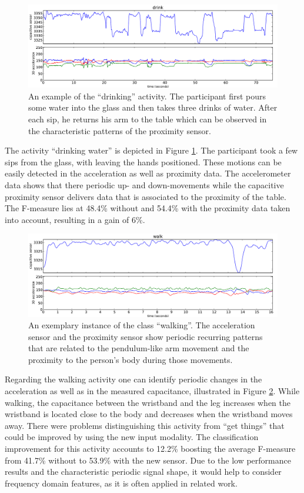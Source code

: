 \documentclass[runningheads,a4paper]{llncs}
\begin{document}
\begin{figure}[t]
	\centering
		\includegraphics[width=\textwidth]{../Auswertung/images/eugen_7.pdf}
	\caption{An example of the ``drinking'' activity. The participant first pours some water into the glass and then takes three drinks of water. After each sip, he returns his arm to the table which can be observed in the characteristic patterns of the proximity sensor.}
	\label{fig:drinking}
\end{figure}

The activity ``drinking water'' is depicted in Figure \ref{fig:drinking}. The participant took a few sips from the glass, with leaving the hands positioned. These motions can be easily detected in the acceleration as well as proximity data. The accelerometer data shows that there periodic up- and down-movements while the capacitive proximity sensor delivers data that is associated to the proximity of the table. The F-measure lies at 48.4\% without and 54.4\% with the proximity data taken into account, resulting in a gain of 6\%.

\begin{figure}[t]
	\centering
		\includegraphics[width=1.00\textwidth]{../Auswertung/images/marko_8.pdf}
	\caption{An exemplary instance of the class ``walking''. The acceleration sensor and the proximity sensor show periodic recurring patterns that are related to the pendulum-like arm movement and the proximity to the person's body during those movements.}
	\label{fig:walking}
\end{figure}

Regarding the walking activity one can identify periodic changes in the acceleration as well as in the measured capacitance, illustrated in Figure \ref{fig:walking}. While walking, the capacitance between the wristband and the leg increases when the wristband is located close to the body and decreases when the wristband moves away. There were problems distinguishing this activity from ``get things'' that could be improved by using the new input modality. The classification improvement for this activity accounts to 12.2\% boosting the average F-measure from 41.7\% without to 53.9\% with the new sensor. Due to the low performance results and the characteristic periodic signal shape, it would help to consider frequency domain features, as it is often applied in related work.
\end{document}
